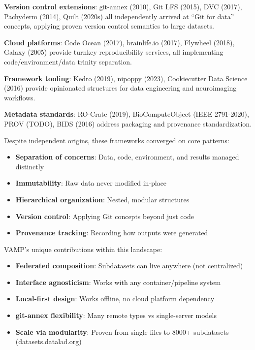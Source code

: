 \documentclass{article}
\begin{document}
\textbf{Version control extensions}: git-annex (2010), Git LFS (2015), DVC (2017), Pachyderm (2014), Quilt (2020s) all independently arrived at ``Git for data'' concepts, applying proven version control semantics to large datasets.

\textbf{Cloud platforms}: Code Ocean (2017), brainlife.io (2017), Flywheel (2018), Galaxy (2005) provide turnkey reproducibility services, all implementing code/environment/data trinity separation.

\textbf{Framework tooling}: Kedro (2019), nipoppy (2023), Cookiecutter Data Science (2016) provide opinionated structures for data engineering and neuroimaging workflows.

\textbf{Metadata standards}: RO-Crate (2019), BioComputeObject (IEEE 2791-2020), PROV (TODO), BIDS (2016) address packaging and provenance standardization.

Despite independent origins, these frameworks converged on core patterns:
\begin{itemize}
    \item \textbf{Separation of concerns}: Data, code, environment, and results managed distinctly
    \item \textbf{Immutability}: Raw data never modified in-place
    \item \textbf{Hierarchical organization}: Nested, modular structures
    \item \textbf{Version control}: Applying Git concepts beyond just code
    \item \textbf{Provenance tracking}: Recording how outputs were generated
\end{itemize}

VAMP's unique contributions within this landscape:
\begin{itemize}
    \item \textbf{Federated composition}: Subdatasets can live anywhere (not centralized)
    \item \textbf{Interface agnosticism}: Works with any container/pipeline system
    \item \textbf{Local-first design}: Works offline, no cloud platform dependency
    \item \textbf{git-annex flexibility}: Many remote types vs single-server models
    \item \textbf{Scale via modularity}: Proven from single files to 8000+ subdatasets (datasets.datalad.org)
\end{itemize}
\end{document}
